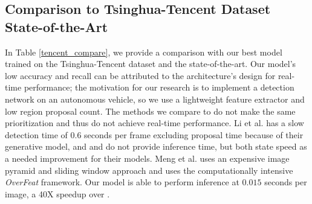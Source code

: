 \documentclass[10pt, conference, compsocconf]{IEEEtran}
\begin{document}
\subsection{Comparison to Tsinghua-Tencent Dataset State-of-the-Art}

In Table \ref{tencent_compare}, we provide a comparison with our best model trained on the Tsinghua-Tencent dataset and the state-of-the-art. Our model's low accuracy and recall can be attributed to the architecture's design for real-time performance; the motivation for our research is to implement a detection network on an autonomous vehicle, so we use a lightweight feature extractor and low region proposal count. The methods we compare to do not make the same prioritization and thus do not achieve real-time performance. Li et al. \cite{perceptual_gan} has a slow detection time of $0.6$ seconds per frame excluding proposal time because of their generative model, and \cite{meng} and \cite{tencent} do not provide inference time, but both state speed as a needed improvement for their models. Meng et al. \cite{meng} uses an expensive image pyramid and sliding window approach and \cite{tencent} uses the computationally intensive \textit{OverFeat} \cite{overfeat} framework.  Our model is able to perform inference at $0.015$ seconds per image, a 40X speedup over \cite{perceptual_gan}.

\begin{table}[t]
\centering
{}
\caption{Accuracy (A) and recall (R) comparison with the Tsinghua-Tencent state-of-the-art detectors. \cite{meng} only cites an overall accuracy and recall.}
\label{tencent_compare}
\end{table}
\end{document}
